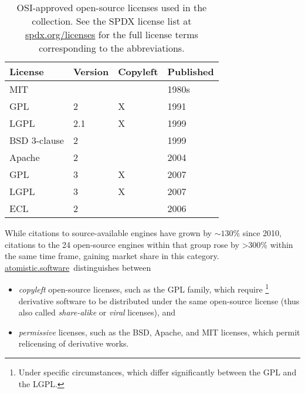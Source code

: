 \documentclass[9pt,review,pubversion]{livecoms}
\newcommand{\atsoft}{\href{https://atomistic.software}{atomistic.software}\ }
\begin{document}
\begin{table}
    \centering
    \begin{tabular}{llll} \toprule
        License & Version & Copyleft & Published  \\ \midrule
        MIT &   &   & 1980s\\
        GPL & 2 & X & 1991\\
        LGPL & 2.1 & X & 1999\\
        BSD 3-clause & 2 &   & 1999\\
        Apache & 2 &   & 2004\\
        GPL & 3 & X & 2007\\
        LGPL & 3 & X & 2007\\
        ECL & 2 &   & 2006\\
\bottomrule
    \end{tabular}
    \caption{
        OSI-approved open-source licenses used in the collection.
        See the SPDX license list at \url{spdx.org/licenses} for the full license terms corresponding to the abbreviations.
    }
    \label{tab:open-source-licenses}
\end{table}


While citations to source-available engines have grown by ${\sim}130\%$ since 2010, 
citations to the 24 open-source engines within that group rose by >300\% within the same time frame, gaining market share in this category.
\atsoft distinguishes between 
\begin{itemize}
    \item 
        \emph{copyleft} open-source licenses, such as the GPL family, which require%
\footnote{Under specific circumstances, which differ significantly between the GPL and the LGPL.}
        derivative software to be distributed under the same open-source license (thus also called \emph{share-alike} or \emph{viral} licenses), and
\item
\emph{permissive} licenses, such as the BSD, Apache, and MIT licenses, which permit relicensing of derivative works.
\end{itemize}
\end{document}
